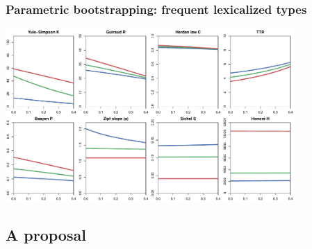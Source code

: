 \documentclass[t]{beamer} %
\begin{document}
\begin{frame}[c]
  \frametitle{Parametric bootstrapping: frequent lexicalized types}

  \centering
  \includegraphics[width=11cm]{img/lexconst_echo_type}
\end{frame}


\subsection{A proposal}
\end{document}
